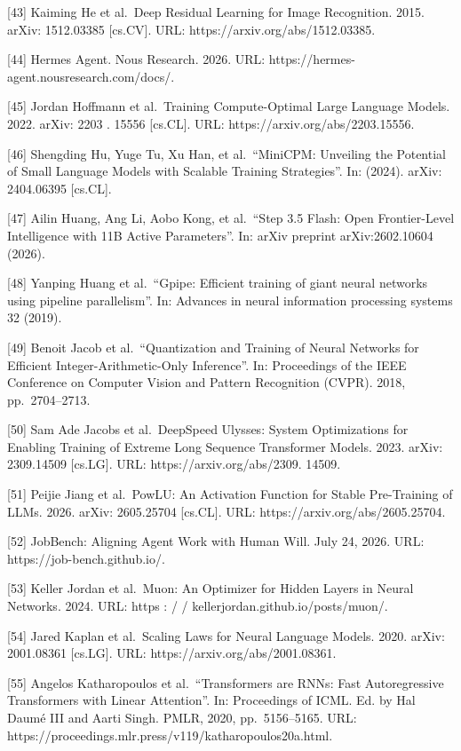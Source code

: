 {[}43{]} Kaiming He et al.~Deep Residual Learning for Image Recognition.
2015. arXiv: 1512.03385 {[}cs.CV{]}. URL:
https://arxiv.org/abs/1512.03385.

{[}44{]} Hermes Agent. Nous Research. 2026. URL:
https://hermes-agent.nousresearch.com/docs/.

{[}45{]} Jordan Hoffmann et al.~Training Compute-Optimal Large Language
Models. 2022. arXiv: 2203 . 15556 {[}cs.CL{]}. URL:
https://arxiv.org/abs/2203.15556.

{[}46{]} Shengding Hu, Yuge Tu, Xu Han, et al.~``MiniCPM: Unveiling the
Potential of Small Language Models with Scalable Training Strategies''.
In: (2024). arXiv: 2404.06395 {[}cs.CL{]}.

{[}47{]} Ailin Huang, Ang Li, Aobo Kong, et al.~``Step 3.5 Flash: Open
Frontier-Level Intelligence with 11B Active Parameters''. In: arXiv
preprint arXiv:2602.10604 (2026).

{[}48{]} Yanping Huang et al.~``Gpipe: Efficient training of giant
neural networks using pipeline parallelism''. In: Advances in neural
information processing systems 32 (2019).

{[}49{]} Benoit Jacob et al.~``Quantization and Training of Neural
Networks for Efficient Integer-Arithmetic-Only Inference''. In:
Proceedings of the IEEE Conference on Computer Vision and Pattern
Recognition (CVPR). 2018, pp.~2704--2713.

{[}50{]} Sam Ade Jacobs et al.~DeepSpeed Ulysses: System Optimizations
for Enabling Training of Extreme Long Sequence Transformer Models. 2023.
arXiv: 2309.14509 {[}cs.LG{]}. URL: https://arxiv.org/abs/2309. 14509.

{[}51{]} Peijie Jiang et al.~PowLU: An Activation Function for Stable
Pre-Training of LLMs. 2026. arXiv: 2605.25704 {[}cs.CL{]}. URL:
https://arxiv.org/abs/2605.25704.

{[}52{]} JobBench: Aligning Agent Work with Human Will. July 24, 2026.
URL: https://job-bench.github.io/.

{[}53{]} Keller Jordan et al.~Muon: An Optimizer for Hidden Layers in
Neural Networks. 2024. URL: https : / /
kellerjordan.github.io/posts/muon/.

{[}54{]} Jared Kaplan et al.~Scaling Laws for Neural Language Models.
2020. arXiv: 2001.08361 {[}cs.LG{]}. URL:
https://arxiv.org/abs/2001.08361.

{[}55{]} Angelos Katharopoulos et al.~``Transformers are RNNs: Fast
Autoregressive Transformers with Linear Attention''. In: Proceedings of
ICML. Ed. by Hal Daumé III and Aarti Singh. PMLR, 2020, pp.~5156--5165.
URL: https://proceedings.mlr.press/v119/katharopoulos20a.html.

